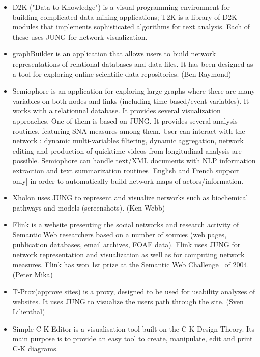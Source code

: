 \begin{enumerate}
\begin{itemize}
\item D2K ("Data to Knowledge") is a visual programming environment for building complicated data mining applications; T2K is a library of D2K modules that implements sophisticated algorithms for text analysis. Each of these uses JUNG for network visualization.~\cite{D2K}

\item graphBuilder is an application that allows users to build network representations of relational databases and data files. It has been designed as a tool for exploring online scientific data repositories. (Ben Raymond)~\cite{GRAPHBUILDER}

\item Semiophore is an application for exploring large graphs where there are many variables on both nodes and links (including time-based/event variables). It works with a relationnal database. It provides several visualization approaches. One of them is based on JUNG. It provides several analysis routines, featuring SNA measures among them. User can interact with the network : dynamic multi-variables filtering, dynamic aggregation, network editing and production of quicktime videos from longitudinal analysis are possible. Semiophore can handle text/XML documents with NLP information extraction and text summarization routines [English and French support only] in order to automatically build network maps of actors/information.~\cite{SEMIOPHORE}

\item Xholon uses JUNG to represent and visualize networks such as biochemical pathways and models (screenshots). (Ken Webb)~\cite{XHOLON}

\item Flink is a website presenting the social networks and research activity of Semantic Web researchers based on a number of sources (web pages, publication databases, email archives, FOAF data). Flink uses JUNG for network representation and visualization as well as for computing network measures. Flink has won 1st prize at the Semantic Web Challenge~\cite{SWC} of 2004. (Peter Mika)~\cite{FLINK}

\item T-Prox(approve sites) is a proxy, designed to be used for usability analyzes of websites. It uses JUNG to visualize the users path through the site. (Sven Lilienthal)~\cite{T_PROX}

\item Simple C-K Editor is a visualisation tool built on the C-K Design Theory. Its main purpose is to provide an easy tool to create, manipulate, edit and print C-K diagrams.~\cite{SIMPLE_C_K_EDITOR}


\end{itemize}
\end{enumerate}
